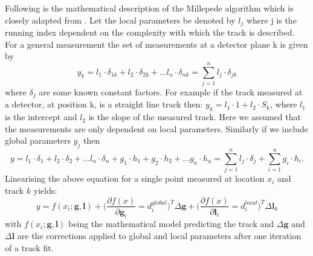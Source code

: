 Following is the mathematical description of the Millepede algorithm which is closely adapted from \cite{Blobel:2002ax,Blusk:2007zza}.
Let the local parameters be denoted by $l_j$ where j is the  running index dependent on the complexity with which the track is described. For a general measurement the set of measurements at a detector plane k is given by
\begin{equation}
  y_k = l_1 \cdot \delta_{1k} + l_2 \cdot \delta_{2k} + ...l_n \cdot \delta_{nk} = \sum_{j=1}^n l_j \cdot \delta_{jk}
\end{equation}
where $\delta_j$ are some known constant factors. For example if the track measured at a detector, at position k, is a straight line track then: $y_k = l_1 \cdot 1 + l_2 \cdot S_k  $, where $l_1$ is the intercept and $l_2$ is the slope of the measured track. Here we assumed that the measurements are only dependent on local parameters. Similarly if we include global parameters $g_j$ then
\begin{equation}
  y = l_1 \cdot \delta_{1} + l_2 \cdot \delta_{2} + ...l_n \cdot \delta_{n} + g_1 \cdot h_{1} + g_2 \cdot h_{2} + ...g_n \cdot h_{u} = \sum_{j=1}^n l_j \cdot \delta_{j} + \sum_{i=1}^u g_i \cdot h_i .
\end{equation}
Linearising the above equation for a single point measured at location $x_i$ and track $k$ yields:
\begin{equation}
  y = f(x_i;\textbf{g},\textbf{l}) + \Bigg(  \frac{\partial f(x)}{\partial \textbf{g}_i} = d_i^{global} \Bigg)^T  \Delta\textbf{g} + \Bigg( \frac{\partial f(x)}{\partial \textbf{l}_i} = d_i^{local} \Bigg)^T  \Delta\textbf{l}_k
\end{equation}
with $f(x_i;\textbf{g},\textbf{l})$ being the mathematical model predicting the track and $\Delta\textbf{g}$ and $\Delta\textbf{l}$ are the corrections applied to global and local parameters after one iteration of a track fit.

